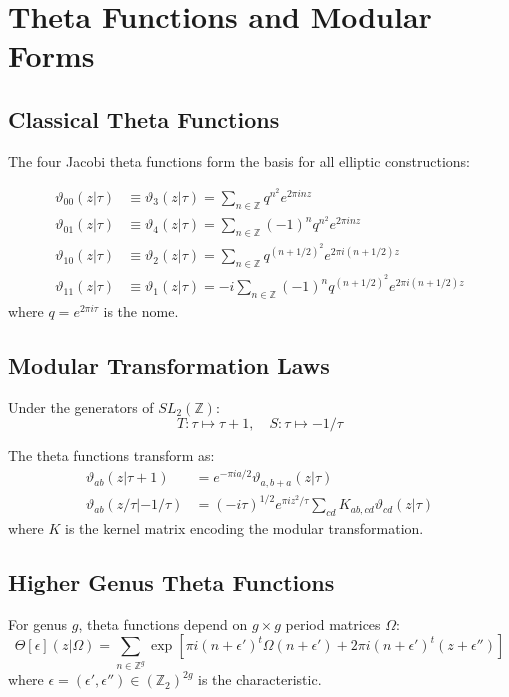 
\section{Theta Functions and Modular Forms}

\subsection{Classical Theta Functions}

The four Jacobi theta functions form the basis for all elliptic constructions:

\begin{definition}
\begin{align}
\vartheta_{00}(z|\tau) &\equiv \vartheta_3(z|\tau) = \sum_{n \in \mathbb{Z}} q^{n^2} e^{2\pi inz} \\
\vartheta_{01}(z|\tau) &\equiv \vartheta_4(z|\tau) = \sum_{n \in \mathbb{Z}}(-1)^n q^{n^2} e^{2\pi inz} \\
\vartheta_{10}(z|\tau) &\equiv \vartheta_2(z|\tau) = \sum_{n \in \mathbb{Z}} q^{(n+1/2)^2} e^{2\pi i(n+1/2)z} \\
\vartheta_{11}(z|\tau) &\equiv \vartheta_1(z|\tau) = -i\sum_{n \in \mathbb{Z}}(-1)^n q^{(n+1/2)^2} e^{2\pi i(n+1/2)z}
\end{align}
where $q = e^{2\pi i\tau}$ is the nome.
\end{definition}

\subsection{Modular Transformation Laws}

Under the generators of $SL_2(\mathbb{Z})$:
$$T: \tau \mapsto \tau + 1, \quad S: \tau \mapsto -1/\tau$$

The theta functions transform as:
\begin{align}
\vartheta_{ab}(z|\tau+1) &= e^{-\pi ia/2} \vartheta_{a,b+a}(z|\tau) \\
\vartheta_{ab}(z/\tau|-1/\tau) &= (-i\tau)^{1/2} e^{\pi iz^2/\tau} \sum_{cd} K_{ab,cd} \vartheta_{cd}(z|\tau)
\end{align}
where $K$ is the kernel matrix encoding the modular transformation.

\subsection{Higher Genus Theta Functions}

For genus $g$, theta functions depend on $g \times g$ period matrices $\Omega$:
$$\Theta[\epsilon](z|\Omega) = \sum_{n \in \mathbb{Z}^g} \exp\left[\pi i(n+\epsilon')^t\Omega(n+\epsilon') + 2\pi i(n+\epsilon')^t(z+\epsilon'')\right]$$
where $\epsilon = (\epsilon', \epsilon'') \in (\mathbb{Z}_2)^{2g}$ is the characteristic.

